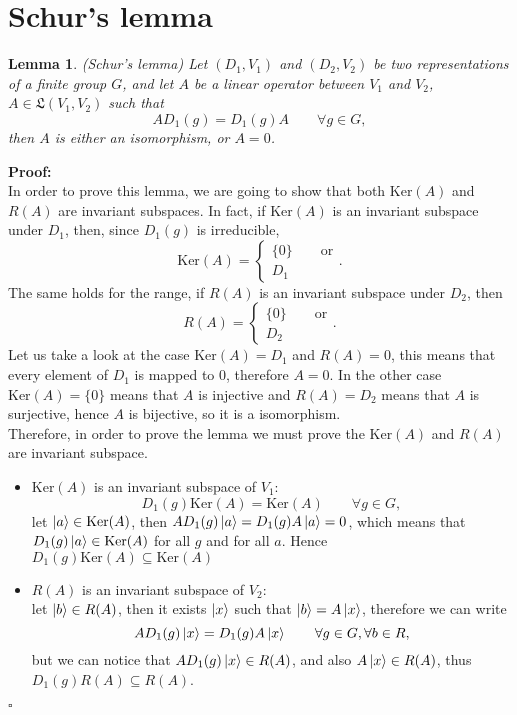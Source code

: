 \documentclass[12pt]{book}
\theoremstyle{plain}
\newtheorem{lem}[thm]{Lemma}
\theoremstyle{definition}
\theoremstyle{remark}
\begin{document}
\section{Schur's lemma}
\begin{lem}(Schur's lemma)
Let $(D_1,V_1)$ and $(D_2,V_2)$ be two representations of a finite group $G$, and let  $A$ be a linear operator between $V_1$ and $V_2$, $A\in \mathfrak{L}(V_1,V_2)$ such that
\[AD_1(g) = D_1(g) A \qquad \forall g \in G,\]
then $A$ is either an isomorphism, or $A=0$.
\end{lem}
\hspace{-1.4em}\textbf{Proof:}\\
In order to prove this lemma, we are going to show that both $\text{Ker}(A)$ and $R(A)$ are invariant subspaces. In fact, if $\text{Ker}(A)$ is an invariant subspace under $D_1$, then, since $D_1(g)$ is irreducible,
\[\text{Ker}(A) = \begin{cases} \{0\} \qquad \text{or}\\
D_1\end{cases}. \]
The same holds for the range, if $R(A)$ is an invariant subspace under $D_2$, then 
\[R(A) = \begin{cases} \{0\} \qquad \text{or}\\
D_2\end{cases}. \]
Let us take a look at the case $\text{Ker}(A) = D_1$ and $R(A) = 0$, this means that every element of $D_1$ is mapped to 0, therefore $A=0$. In the other case $\text{Ker}(A) = \{0\}$ means that $A$ is injective and $R(A) = D_2$ means that $A$ is surjective, hence $A$ is bijective, so it is a isomorphism.\\
Therefore, in order to prove the lemma we must prove the $\text{Ker}(A)$ and $R(A)$ are invariant subspace.
\begin{itemize}
	\item $\text{Ker}(A)$ is an invariant subspace of $V_1$:
	\[D_1(g)\text{Ker}(A) = \text{Ker}(A) \qquad \forall g\in G,\]
	let $\ket{a}\in \text{Ker}(A)$, then $AD_1(g) \ket{a} = D_1(g)A\ket{a} = 0$, which means that $D_1(g) \ket{a}\in\text{Ker}(A)$ for all $g$ and for all $a$. Hence $D_1(g)\text{Ker}(A) \subseteq \text{Ker}(A)$ 
	\item $R(A)$ is an invariant subspace of $V_2$:\\
	let $\ket{b}\in R(A)$, then it exists $\ket{x}$ such that $\ket{b} = A\ket{x}$, therefore we can write
	\[AD_1(g) \ket{x} = D_1(g)A\ket{x} \qquad \forall g\in G,\forall b\in R,\]
	but we can notice that $AD_1(g) \ket{x}\in R(A)$, and also $A\ket{x}\in R(A)$, thus $D_1(g)R(A) \subseteq R(A)$.
\end{itemize}\hfill\ensuremath{\square}\\
\end{document}
